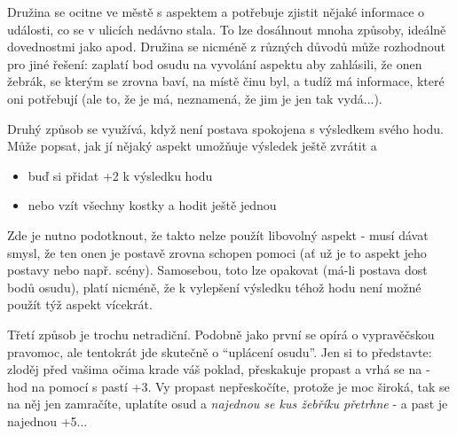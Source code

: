 \documentclass[../main.tex]{subfiles}
\begin{document}
\begin{example}
Družina se ocitne ve městě s aspektem  a potřebuje zjistit nějaké informace o události, co se v ulicích nedávno stala. To lze dosáhnout mnoha způsoby, ideálně dovednostmi jako  apod. Družina se nicméně z různých důvodů  může rozhodnout pro jiné řešení: zaplatí bod osudu na vyvolání aspektu  aby zahlásili, že onen žebrák, se kterým se zrovna baví, na místě činu byl, a tudíž má informace, které oni potřebují (ale to, že je má, neznamená, že jim je jen tak vydá...).\\
\end{example}

Druhý způsob se využívá, když není postava spokojena s výsledkem svého hodu. Může popsat, jak jí nějaký aspekt umožňuje výsledek ještě zvrátit a

\begin{Pravidlo}
\begin{itemize}
\item buď si přidat +2 k výsledku hodu
\item nebo vzít všechny kostky a hodit ještě jednou
\end{itemize}
\end{Pravidlo}

Zde je nutno podotknout, že takto nelze použít libovolný aspekt - musí dávat smysl, že ten onen je postavě zrovna schopen pomoci (ať už je to aspekt jeho postavy nebo např. scény). Samosebou, toto lze opakovat (má-li postava dost bodů osudu), platí nicméně, že k vylepšení výsledku téhož hodu není možné použít týž aspekt vícekrát.

Třetí způsob je trochu netradiční. Podobně jako první se opírá o vypravěčskou pravomoc, ale tentokrát jde skutečně o ``uplácení osudu''. Jen si to představte: zloděj před vašima očima krade váš poklad, přeskakuje propast a vrhá se na  - hod na  pomocí  s pastí +3. Vy propast nepřeskočíte, protože je moc široká, tak se na něj jen zamračíte, uplatíte osud a \emph{najednou se kus žebříku přetrhne} - a past je najednou +5... 
\end{document}

